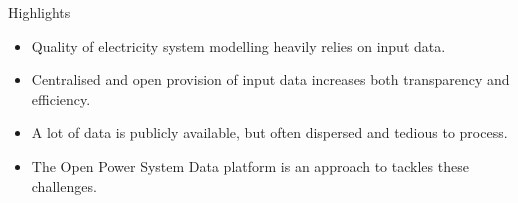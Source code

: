 Highlights
\begin{itemize}
    \item Quality of electricity system modelling heavily relies on input data.
    \item Centralised and open provision of input data increases both transparency and efficiency.
    \item A lot of data is publicly available, but often dispersed and tedious to process.
    \item The Open Power System Data platform is an approach to tackles these challenges.
\end{itemize}